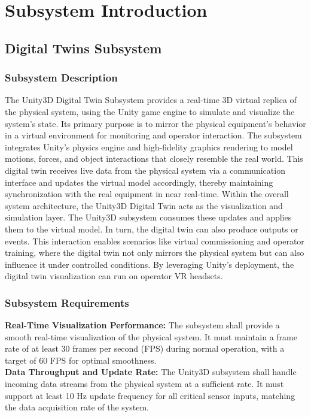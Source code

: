 \documentclass{senior-design}
\begin{document}
\section{Subsystem Introduction}
\subsection{Digital Twins Subsystem}
\subsubsection*{Subsystem Description}
The Unity3D Digital Twin Subsystem provides a real-time 3D virtual replica of 
the physical system, using the Unity game engine to simulate and visualize the 
system's state. Its primary purpose is to mirror the physical equipment's 
behavior in a virtual environment for monitoring and operator interaction. 
The subsystem integrates Unity's physics engine and high-fidelity graphics 
rendering to model motions, forces, and object interactions that closely 
resemble the real world​. This digital twin receives live data from the physical 
system via a communication interface and updates the virtual model accordingly, 
thereby maintaining synchronization with the real equipment in near real-time. 
Within the overall system architecture, the Unity3D Digital Twin acts as the 
visualization and simulation layer. The Unity3D subsystem consumes these updates 
and applies them to the virtual model. In turn, the digital twin can also produce 
outputs or events​. This interaction enables scenarios like virtual commissioning 
and operator training, where the digital twin not only mirrors the physical 
system but can also influence it under controlled conditions. By leveraging 
Unity’s deployment, the digital twin visualization can run on operator VR 
headsets. 
\subsubsection*{Subsystem Requirements}
\textbf{Real-Time Visualization Performance:} The subsystem shall provide a smooth 
real-time visualization of the physical system. It must maintain a frame rate 
of at least 30 frames per second (FPS) during normal operation, with a target 
of 60 FPS for optimal smoothness.
\\
  
\textbf{Data Throughput and Update Rate:} The Unity3D subsystem shall handle incoming 
data streams from the physical system at a sufficient rate. It must support at 
least 10 Hz update frequency for all critical sensor inputs, matching the data 
acquisition rate of the system​. 
\\
  
\end{document}
